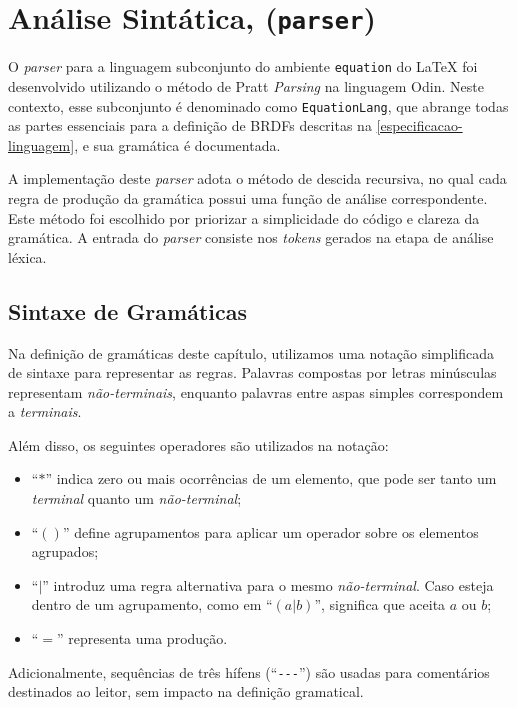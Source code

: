 
\section{Análise Sintática, (\texttt{parser})} \label{section-parser}

O \textit{parser} para a linguagem subconjunto do ambiente \verb|equation| do \LaTeX{} foi desenvolvido utilizando o método de Pratt \textit{Parsing} na linguagem Odin. Neste contexto, esse subconjunto é denominado como \texttt{EquationLang}, que abrange todas as partes essenciais para a definição de BRDFs descritas na \autoref{especificacao-linguagem}, e sua gramática é documentada.

A implementação deste \textit{parser} adota o método de descida recursiva, no qual cada regra de produção da gramática possui uma função de análise correspondente. Este método foi escolhido por priorizar a  simplicidade do código e clareza da gramática. A entrada do \textit{parser} consiste nos \textit{tokens} gerados na etapa de análise léxica.


\subsection{Sintaxe de Gramáticas} \label{section-sintatic-grammar-notation}
Na definição de gramáticas deste capítulo, utilizamos uma notação simplificada de sintaxe para representar as regras. Palavras compostas por letras minúsculas representam \textit{não-terminais}, enquanto palavras entre aspas simples correspondem a \textit{terminais}.

Além disso, os seguintes operadores são utilizados na notação:
\begin{itemize}
    \item ``$*$'' indica zero ou mais ocorrências de um elemento, que pode ser tanto um \textit{terminal} quanto um \textit{não-terminal};
    \item ``$()$'' define agrupamentos para aplicar um operador sobre os elementos agrupados;
    \item ``$|$''  introduz uma regra alternativa para o mesmo \textit{não-terminal}. Caso esteja dentro de um agrupamento, como em ``$(a|b)$'', significa que aceita $a$ ou $b$;
    \item ``$=$''  representa uma produção.
\end{itemize}

Adicionalmente, sequências de três hífens (``\verb|---|'') são usadas para comentários destinados ao leitor, sem impacto na definição gramatical.


